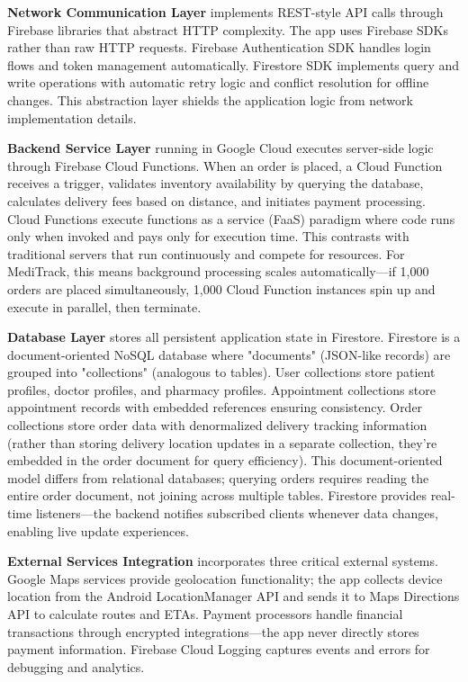 \documentclass[12pt,a4paper]{report}
\begin{document}
\textbf{Network Communication Layer} implements REST-style API calls through Firebase libraries that abstract HTTP complexity. The app uses Firebase SDKs rather than raw HTTP requests. Firebase Authentication SDK handles login flows and token management automatically. Firestore SDK implements query and write operations with automatic retry logic and conflict resolution for offline changes. This abstraction layer shields the application logic from network implementation details.

\textbf{Backend Service Layer} running in Google Cloud executes server-side logic through Firebase Cloud Functions. When an order is placed, a Cloud Function receives a trigger, validates inventory availability by querying the database, calculates delivery fees based on distance, and initiates payment processing. Cloud Functions execute functions as a service (FaaS) paradigm where code runs only when invoked and pays only for execution time. This contrasts with traditional servers that run continuously and compete for resources. For MediTrack, this means background processing scales automatically—if 1,000 orders are placed simultaneously, 1,000 Cloud Function instances spin up and execute in parallel, then terminate.

\textbf{Database Layer} stores all persistent application state in Firestore. Firestore is a document-oriented NoSQL database where "documents" (JSON-like records) are grouped into "collections" (analogous to tables). User collections store patient profiles, doctor profiles, and pharmacy profiles. Appointment collections store appointment records with embedded references ensuring consistency. Order collections store order data with denormalized delivery tracking information (rather than storing delivery location updates in a separate collection, they're embedded in the order document for query efficiency). This document-oriented model differs from relational databases; querying orders requires reading the entire order document, not joining across multiple tables. Firestore provides real-time listeners—the backend notifies subscribed clients whenever data changes, enabling live update experiences.

\textbf{External Services Integration} incorporates three critical external systems. Google Maps services provide geolocation functionality; the app collects device location from the Android LocationManager API and sends it to Maps Directions API to calculate routes and ETAs. Payment processors handle financial transactions through encrypted integrations—the app never directly stores payment information. Firebase Cloud Logging captures events and errors for debugging and analytics.
\end{document}
